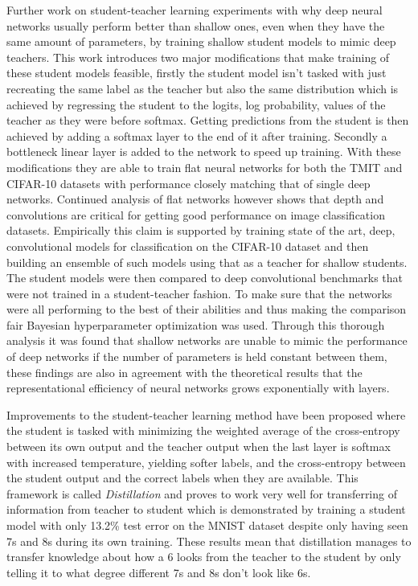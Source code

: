 \documentclass[11pt]{article}
\newcommand{\bibentry}[1]{\cite{#1}}
\begin{document}
Further work on student-teacher learning experiments with why deep neural networks usually perform better than shallow ones, even when they have the same amount of parameters, by training shallow student models to mimic deep teachers\bibentry{ba2014deep}. This work introduces two major modifications that make training of these student models feasible, firstly the student model isn't tasked with just recreating the same label as the teacher but also the same distribution which is achieved by regressing the student to the logits, log probability, values of the teacher as they were before softmax. Getting predictions from the student is then achieved by adding a softmax layer to the end of it after training. Secondly a bottleneck linear layer is added to the network to speed up training. With these modifications they are able to train flat neural networks for both the TMIT and CIFAR-10 datasets with performance closely matching that of single deep networks. Continued analysis of flat networks however shows that depth and convolutions are critical for getting good performance on image classification datasets\bibentry{urban2016deep}. Empirically this claim is supported by training state of the art, deep, convolutional models for classification on the CIFAR-10 dataset and then building an ensemble of such models using that as a teacher for shallow students. The student models were then compared to deep convolutional benchmarks that were not trained in a student-teacher fashion. To make sure that the networks were all performing to the best of their abilities and thus making the comparison fair Bayesian hyperparameter optimization\bibentry{snoek2012practical} was used. Through this thorough analysis it was found that shallow networks are unable to mimic the performance of deep networks if the number of parameters is held constant between them, these findings are also in agreement with the theoretical results that the representational efficiency of neural networks grows exponentially with layers\bibentry{liang2016deep}.

Improvements to the student-teacher learning method have been proposed where the student is tasked with minimizing the weighted average of the cross-entropy between its own output and the teacher output when the last layer is softmax with increased temperature, yielding softer labels, and the cross-entropy between the student output and the correct labels when they are available. This framework is called \emph{Distillation}\bibentry{hinton2015distilling} and proves to work very well for transferring of information from teacher to student which is demonstrated by training a student model with only 13.2\% test error on the MNIST dataset despite only having seen 7s and 8s during its own training. These results mean that distillation manages to transfer knowledge about how a 6 looks from the teacher to the student by only telling it to what degree different 7s and 8s don't look like 6s.
\end{document}
